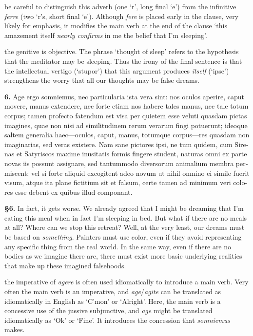  be careful to distinguish this adverb (one `r', long final `e') from the infinitive \textit{ferre} (two `r's, short final `e'). Although \textit{fere} is placed early in the clause, very likely for emphasis, it modifies the main verb at the end of the clause `this amazement itself \textit{nearly confirms} in me the belief that I'm sleeping'.

 the genitive is objective. The phrase `thought of sleep' refers to the hypothesis that the meditator may be sleeping. Thus the irony of the final sentence is that the intellectual vertigo (`stupor') that this argument produces \textit{itself} (`ipse') strengthens the worry that all our thoughts may be false dreams.

\clearpage

\beginnumbering
\pstart
\begin{latin}
\textenglish{\textbf{6.}} Age ergo somniemus, nec particularia ista vera sint: nos oculos aperire, caput movere, manus extendere, nec forte etiam nos habere tales manus, nec tale totum corpus; tamen profecto fatendum est visa per quietem esse veluti quasdam pictas imagines, quae non nisi ad similitudinem rerum verarum fingi potuerunt; ideoque saltem generalia haec---oculos, caput, manus, totumque corpus---res quasdam non imaginarias, sed veras existere. Nam sane pictores ipsi, ne tum quidem, cum Sirenas et Satyriscos maxime inusitatis formis fingere student, naturas omni ex parte novas iis possunt assignare, sed tantummodo diversorum animalium membra permiscent; vel si forte aliquid excogitent adeo novum ut nihil omnino ei simile fuerit visum, atque ita plane fictitium sit et falsum, certe tamen ad minimum veri colores esse debent ex quibus illud componant.
\end{latin}
\pend
\endnumbering

\prenotes

\textbf{§6.} In fact, it gets worse. We already agreed that I might be dreaming that I'm eating this meal when in fact I'm sleeping in bed. But what if there are no meals at all? Where can we stop this retreat? Well, at the very least, our dreams must be based on \textit{something}. Painters must use color, even if they avoid representing any specific thing from the real world. In the same way, even if there are no bodies as we imagine there are, there must exist more basic underlying realities that make up these imagined falsehoods.

 the imperative of \textit{agere} is often used idiomatically to introduce a main verb. Very often the main verb is an imperative, and \textit{age}/\textit{agite} can be translated as idiomatically in English as `C'mon' or `Alright'. Here, the main verb is a concessive use of the jussive subjunctive, and \textit{age} might be translated idiomatically as `Ok' or `Fine'. It introduces the concession that \textit{somniemus} makes.

